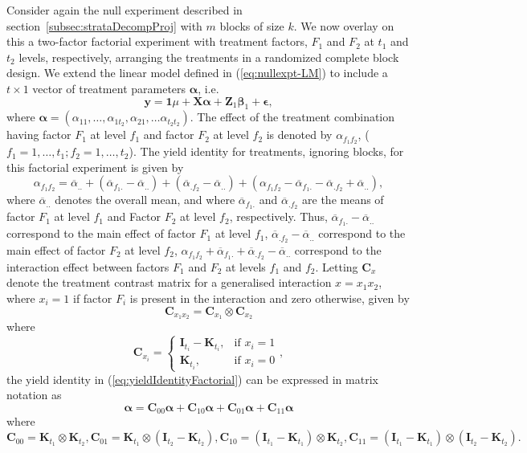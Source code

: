 \documentclass[article]{jss}
\newcommand{\I}{\mathbf{I}}
\newcommand{\K}{\mathbf{K}}
\newcommand{\Z}{\mathbf{Z}}
\newcommand{\X}{\mathbf{X}}
\newcommand{\C}{\mathbf{C}}
\begin{document}
Consider again the null experiment described in section~\ref{subsec:strataDecompProj} with $m$ blocks of size $k$. We now overlay on this a two-factor factorial experiment with treatment factors, $F_1$ and $F_2$ at $t_1$ and $t_2$ levels, respectively, arranging the treatments in a randomized complete block design. We extend the linear model defined in (\ref{eq:nullexpt-LM}) to include a $t\times 1$ vector of treatment parameters $\bm{\alpha}$, i.e.\
\begin{equation}\label{eq:factexpt-in-rcbd-LM}
\bm{y} = \mathbf{1}\mu + \X\bm{\alpha} + \Z_1\bm{\beta}_1 + \bm{\epsilon},
\end{equation}
where $\bm{\alpha} = (\alpha_{1 1}, \dots, \alpha_{1 t_2}, \alpha_{2 1}, \dots \alpha_{t_2 t_2})$. The effect of the treatment combination having factor $F_1$ at level $f_1$ and factor $F_2$ at level $f_2$ is denoted by $\alpha_{f_1 f_2}$, ($f_1= 1,\dots, t_1; f_2 = 1,\dots,t_2$). The yield identity for treatments, ignoring blocks, for this factorial experiment is given by
\begin{equation}
\label{eq:yieldIdentityFactorial}
\alpha_{f_1 f_2} = \overline{\alpha}_{..}+(\overline{\alpha}_{f_1 .} -\overline{\alpha}_{..}) + (\overline{\alpha}_{.f_2} -\overline{\alpha}_{..}) +(\alpha_{f_1 f_2} - \overline{\alpha}_{f_1 .} - \overline{\alpha}_{.f_2} +\overline{\alpha}_{..}),
\end{equation}
where $\overline{\alpha}_{..}$ denotes the overall mean, and where $\overline{\alpha}_{f_1.}$ and $\overline{\alpha}_{.f_2}$ are the means of factor $F_1$ at level $f_1$ and Factor $F_2$ at level $f_2$, respectively. Thus, $\overline{\alpha}_{f_1.} -\overline{\alpha}_{..}$ correspond to the main effect of factor $F_1$ at level $f_1$, $\overline{\alpha}_{.f_2} -\overline{\alpha}_{..}$ correspond to the main effect of factor $F_2$ at level $f_2$, $\alpha_{f_1 f_2} + \overline{\alpha}_{f_1.} + \overline{\alpha}_{. f_2} -\overline{\alpha}_{..}$ correspond to the interaction effect between factors $F_1$ and $F_2$ at levels $f_1$ and $f_2$. Letting $\C_x$ denote the treatment contrast matrix for a generalised interaction $x = x_1 x_2$, where $x_i=1$ if factor $F_i$ is present in the interaction and zero otherwise, given by  
\[
\C_{x_1 x_2} =  \C_{x_1} \otimes  \C_{x_2}
\]
 where 
 \begin{equation}\label{eq:contrMat}
 	\C_{x_i} =  
 	\begin{cases}
 		\I_{t_i} - \K_{t_i}, & \mbox{if } x_i = 1\\
 		\K_{t_i}, & \mbox{if } x_i = 0 
 	\end{cases},
 \end{equation}
the yield identity in (\ref{eq:yieldIdentityFactorial}) can be expressed in matrix notation as
\[
\bm{\alpha} =  \C_{00} \bm{\alpha} +  \C_{10} \bm{\alpha} +   \C_{01} \bm{\alpha} +   \C_{11} \bm{\alpha} 
\]
where
\[
 \C_{00} = \K_{t_1} \otimes \K_{t_2}, \C_{01} = \K_{t_1} \otimes (\I_{t_2} - \K_{t_2}), \C_{10} = (\I_{t_1} - \K_{t_1}) \otimes \K_{t_2}, \C_{11} = (\I_{t_1} - \K_{t_1}) \otimes (\I_{t_2} - \K_{t_2}).
\]
\end{document}
